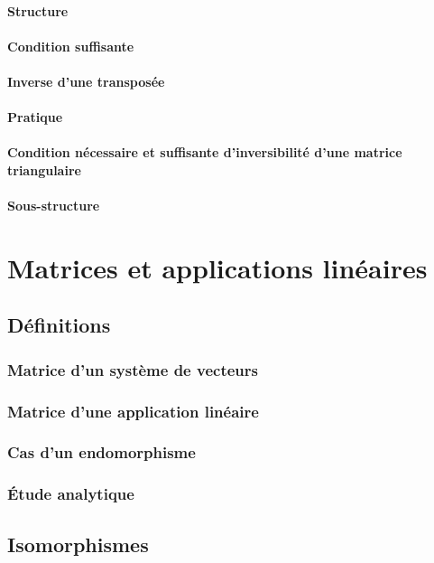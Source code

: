 \documentclass[12pt,a4paper,french]{book}
\begin{document}
			\subsubsection{Structure}
			\subsubsection{Condition suffisante}
			\subsubsection{Inverse d'une transposée}
			\subsubsection{Pratique}
			\subsubsection{Condition nécessaire et suffisante d'inversibilité d'une matrice triangulaire}
			\subsubsection{Sous-structure}
			
\chapter{Matrices et applications linéaires}
	\section{Définitions}
		\subsection{Matrice d'un système de vecteurs}
		\subsection{Matrice d'une application linéaire}
		\subsection{Cas d'un endomorphisme}
		\subsection{Étude analytique}
	\section{Isomorphismes}
\end{document}
